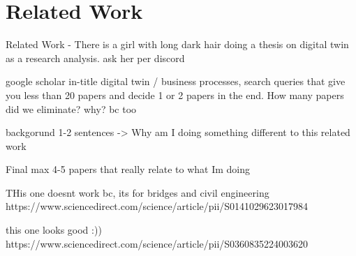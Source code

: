 \chapter{Related Work}
\label{sec:rel}

Related Work - There is a girl with long dark hair doing a thesis on digital twin as a research analysis. ask her per discord

google scholar in-title digital twin / business processes, search queries that give you less than 20 papers and decide 1 or 2 papers in the end. How many papers did we eliminate? why? bc too

backgorund 1-2 sentences
-> Why am I doing something different to this related work

Final max 4-5 papers that really relate to what Im doing


THis one doesnt work bc, its for bridges and civil engineering
https://www.sciencedirect.com/science/article/pii/S0141029623017984

this one looks good :))
https://www.sciencedirect.com/science/article/pii/S0360835224003620